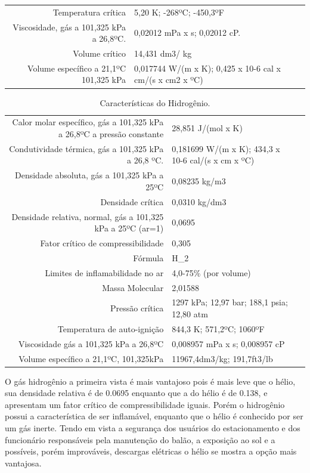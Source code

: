 \begin{table}[h]
\begin{tabular}{|r||lr}
Temperatura crítica                                                  & 5,20 K; -268ºC; -450,3ºF                                 \\
Viscosidade, gás a 101,325 kPa a 26,8ºC.                             & 0,02012 mPa x s; 0,02012 cP.                             \\
Volume crítico                                                       & 14,431 dm3/ kg                                           \\
Volume específico a 21,1ºC 101,325 kPa                               & 0,017744 W/(m x K); 0,425 x 10-6 cal x cm/(s x cm2 x ºC)
\hline
\end{tabular}
\end{table}

\begin{table}[h]
\caption{Características do Hidrogênio.}
\vspace{0.5cm}
\begin{tabular}{|r|lr}
\hline

Calor molar específico, gás a 101,325 kPa a 
 26,8ºC a pressão constante &  28,851 J/(mol x K)\\
Condutividade térmica, gás a 101,325 kPa a 
 26,8 ºC. & 0,181699 W/(m x K);
 434,3 x 10-6 cal/(s x cm x ºC) \\ 
Densidade absoluta, gás a 101,325 kPa a 25ºC  & 0,08235 kg/m3 \\
Densidade crítica   & 0,0310 kg/dm3 \\
Densidade relativa, normal, gás a 101,325 kPa
 a 25ºC (ar=1) &  0,0695\\
Fator crítico de compressibilidade & 0,305 \\
Fórmula   & H_2 \\
 Limites de inflamabilidade no ar & 4,0-75\% (por volume)\\
Massa Molecular & 2,01588 \\
Pressão crítica  & 1297 kPa; 12,97 bar; 188,1 psia;  12,80 atm \\
Temperatura de auto-ignição & 844,3 K; 571,2ºC; 1060ºF\\
Viscosidade gás a 101,325 kPa a 26,8ºC  & 0,008957 mPa x s; 0,008957 cP\\
Volume específico a 21,1ºC, 101,325kPa & 11967,4dm3/kg; 191,7ft3/lb\\

\hline
\end{tabular}
\end{table}

    O gás hidrogênio a primeira vista é mais vantajoso pois é mais leve que o hélio, sua densidade relativa é de 0.0695 enquanto que a do hélio é de 0.138, e apresentam um fator crítico de compressibilidade iguais. Porém o hidrogênio possui a característica de ser inflamável, enquanto que o hélio é conhecido por ser um gás inerte. Tendo em vista a segurança dos usuários do estacionamento e dos funcionário responsáveis pela manutenção do balão, a exposição ao sol e a possíveis, porém improváveis,  descargas elétricas o hélio se mostra a opção mais vantajosa.
    
